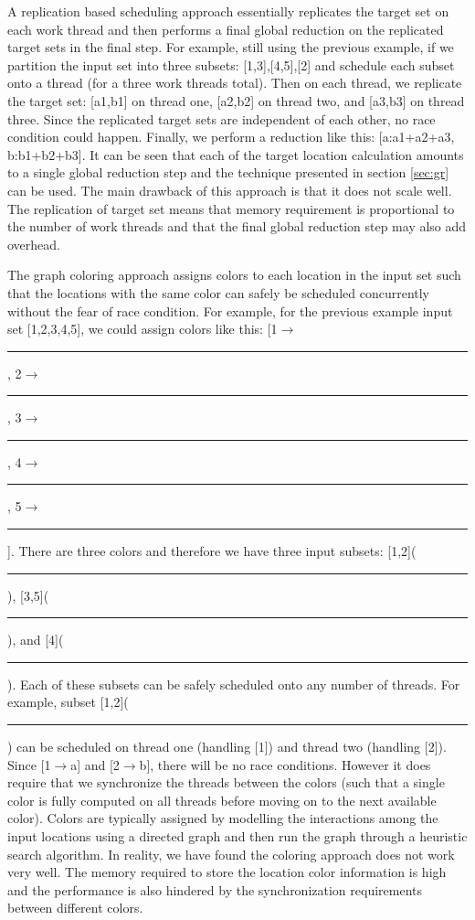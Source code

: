 \documentclass{article}
\newlength{\mylen}
\newcommand\cbox[1][black]{\textcolor{#1}{\rule{\mylen}{\mylen}}}
\begin{document}
A replication based scheduling approach essentially replicates the
target set on each work thread and then performs a final global
reduction on the replicated target sets in the final step.  For example,
still using the previous example, if we partition the input set into
three subsets: [1,3],[4,5],[2] and schedule each subset onto a thread
(for a three work threads total).  Then on each thread, we replicate the
target set: [a1,b1] on thread one, [a2,b2] on thread two, and [a3,b3] on
thread three.  Since the replicated target sets are independent of each
other, no race condition could happen.  Finally, we perform a reduction
like this: [a:a1+a2+a3, b:b1+b2+b3].  It can be seen that each of the
target location calculation amounts to a single global reduction step
and the technique presented in section \ref{sec:gr} can be used.  The
main drawback of this approach is that it does not scale well.  The
replication of target set means that memory requirement is proportional
to the number of work threads and that the final global reduction step
may also add overhead.

The graph coloring approach assigns colors to each location in the input
set such that the locations with the same color can safely be scheduled
concurrently without the fear of race condition.  For example, for the
previous example input set [1,2,3,4,5], we could assign colors like
this: [1$\to$\cbox[red], 2$\to$\cbox[red], 3$\to$\cbox[green],
4$\to$\cbox[blue], 5$\to$\cbox[green]].  There are three colors and
therefore we have three input subsets: [1,2](\cbox[red]),
[3,5](\cbox[green]), and [4](\cbox[blue]).  Each of these subsets can be
safely scheduled onto any number of threads.  For example, subset
[1,2](\cbox[red]) can be scheduled on thread one (handling [1]) and
thread two (handling [2]).  Since [1$\to$a] and [2$\to$b], there will be
no race conditions.  However it does require that we synchronize the
threads between the colors (such that a single color is fully computed
on all threads before moving on to the next available color).  Colors
are typically assigned by modelling the interactions among the input
locations using a directed graph and then run the graph through a
heuristic search algorithm.  In reality, we have found the coloring
approach does not work very well.  The memory required to store the
location color information is high and the performance is also hindered
by the synchronization requirements between different colors.
\end{document}
